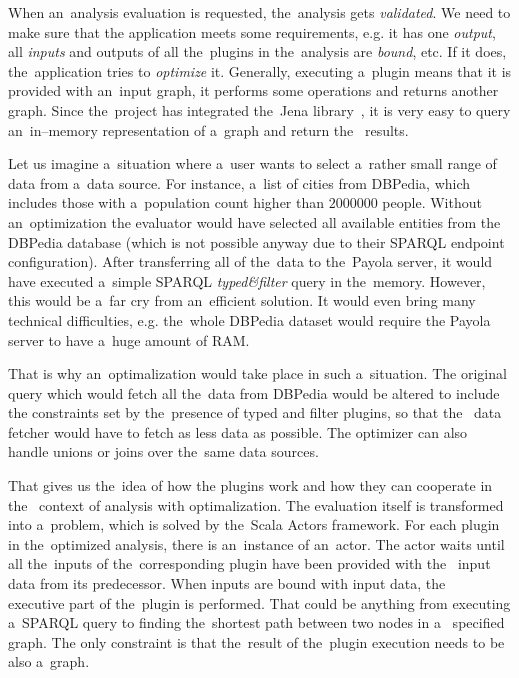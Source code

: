 When an~analysis evaluation is requested, the~analysis gets \emph{validated}. We need to make
sure that the application meets some requirements, e.g. it has one 
\emph{output}, all \emph{inputs} and outputs of all the~plugins in the~analysis are \emph{bound}, etc.
If it does, the~application tries to \emph{optimize} it. Generally, executing a~plugin 
means that it is provided with an~input graph, it performs some operations and 
returns another graph. Since the~project has integrated the~Jena library~\cite{jena}, it is 
very easy to query an~in--memory representation of a~graph and return the~
results.

Let us imagine a~situation where a~user wants to select a~rather small range of 
data from a~data source. For instance, a~list of cities from DBPedia, which includes those
with a~population count higher than $2000000$ people. Without an~optimization
the evaluator would have selected all available entities from the DBPedia 
database (which is not possible anyway due to their SPARQL endpoint 
configuration). After transferring all of the~data to the~Payola server, it would have
executed a~simple SPARQL \emph{typed\&filter} query in the~memory.
However, this would be a~far cry from an~efficient solution. It would even
bring many technical difficulties, e.g. the~whole DBPedia dataset would require 
the Payola server to have a~huge amount of RAM.

That is why an~optimalization would take place in such a~situation. The original 
query which would fetch all the~data from DBPedia would be altered to include 
the constraints set by the~presence of typed and filter plugins, so that the~
data fetcher would have to fetch as less data as possible. The optimizer can 
also handle unions or joins over the~same data sources.

That gives us the~idea of how the plugins work and how they can cooperate in the~
context of analysis with optimalization. The evaluation itself is transformed 
into a~problem, which is solved by the~Scala Actors framework. For each plugin 
in the~optimized analysis, there is an~instance of an~actor. The actor waits 
until all the~inputs of the~corresponding plugin have been provided with the~
input data from its predecessor. When inputs are bound with input data, the~
executive part of the~plugin is performed. That could be anything from 
executing a~SPARQL query to finding the~shortest path between two nodes in a~
specified graph. The only constraint is that the~result of the~plugin execution 
needs to be also a~graph.

